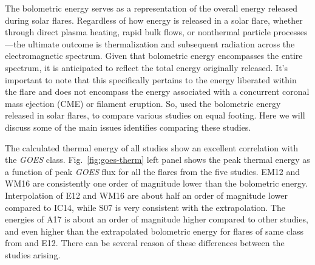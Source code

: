 \begin{table}[h!]
    \centering
    \hline 
    \hline
    \caption{The details of the studies.}
    \label{tab1}
\end{table}

The bolometric energy serves as a representation of the overall energy released during solar flares. Regardless of how energy is released in a solar flare, whether through direct plasma heating, rapid bulk flows, or nonthermal particle processes—the ultimate outcome is thermalization and subsequent radiation across the electromagnetic spectrum. Given that bolometric energy encompasses the entire spectrum, it is anticipated to reflect the total energy originally released. It's important to note that this specifically pertains to the energy liberated within the flare and does not encompass the energy associated with a concurrent coronal mass ejection (CME) or filament eruption. So, \cite{warmuth20} used the bolometric energy released in solar flares, to compare various studies on equal footing. Here we will discuss some of the main issues \cite{warmuth20} identifies comparing these studies.

The calculated thermal energy of all studies show an excellent correlation with the {\it GOES} class. Fig.~\ref{fig:goes-therm} left panel shows the peak thermal energy as a function of peak {\it GOES} flux for all the flares from the five studies. EM12 and WM16 are consistently one order of magnitude lower than the bolometric energy. Interpolation of E12 and WM16 are about half an order of magnitude lower compared to IC14, while S07 is very consistent with the extrapolation. The energies of A17 is about an order of magnitude higher compared to other studies, and even higher than the extrapolated bolometric energy for flares of same class from \cite{kretzschmar11} and E12. There can be several reason of these differences between the studies arising.


